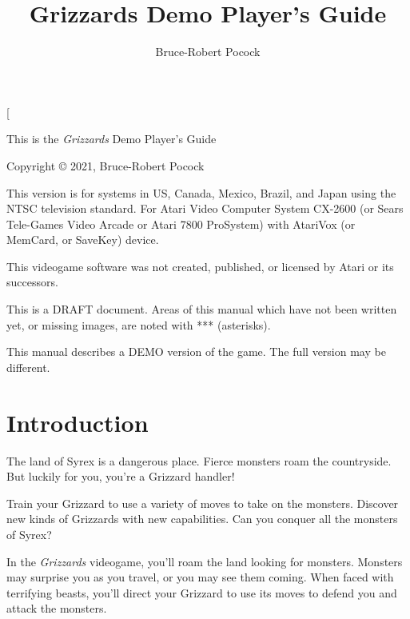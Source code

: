 \documentclass[10pt,twocolumn,openany,article]{memoir}
\title{Grizzards \ifdefined\DEMO Demo \fi Player's Guide}
\author{Bruce-Robert Pocock}
\makeatletter
\newcommand\TV{NTSC}
\newcommand\REGION{US, Canada, Mexico, Brazil, and Japan}
\newcommand\TV{PAL}
\newcommand\REGION{UK and Europe (except France)}
\newcommand\TV{SECAM}
\newcommand\REGION{France, Russia, Africa}
\def\maketitle{%
  \null
  \thispagestyle{empty}%
  \vfill
  \begin{center}\leavevmode
    \normalfont
    {\LARGE\raggedleft \@author\par}%
    \hrulefill\par
    {\huge\raggedright \@title\par}%
    \vskip 1cm
  \end{center}%
  \vfill
  \null
  \cleardoublepage
  }
\makeatother
\begin{document}
\frontmatter




\thispagestyle{empty}

\twocolumn[

\null{}\vspace{1in}

This is the \textit{Grizzards} \ifdefined\DEMO Demo \fi Player's Guide

Copyright \copyright{} 2021, Bruce-Robert Pocock

\bigskip

This  version is  for systems  in \REGION{}  using the  \TV{} television
standard. For Atari  Video Computer System CX-2600  (or Sears Tele-Games
Video  Arcade or  Atari 7800  ProSystem) with  AtariVox (or  MemCard, or
SaveKey) device.

\bigskip

This videogame software was not created, published, or licensed by Atari
or its successors.

\bigskip

This  is a  DRAFT document.  Areas of  this manual  which have  not been
written yet, or missing images, are noted with *** (asterisks).

\ifdefined\DEMO
This manual describes  a DEMO version of the game.  The full version may
be different.
\fi

\vspace{1in}

\chapter*{Introduction}\label{Introduction}

The  land of  Syrex  is  a dangerous  place.  Fierce  monsters roam  the
countryside. But luckily for you, you're a Grizzard handler!

Train your Grizzard to  use a variety of moves to  take on the monsters.
Discover new kinds  of Grizzards with new capabilities.  Can you conquer
all the monsters of Syrex?

\bigskip

In the \textit{Grizzards}  videogame, you'll roam the land  looking for monsters.
Monsters may  surprise you as  you travel, or  you may see  them coming.
When faced  with terrifying beasts,  you'll direct your Grizzard  to use
its moves to defend you and attack the monsters.
\end{document}
